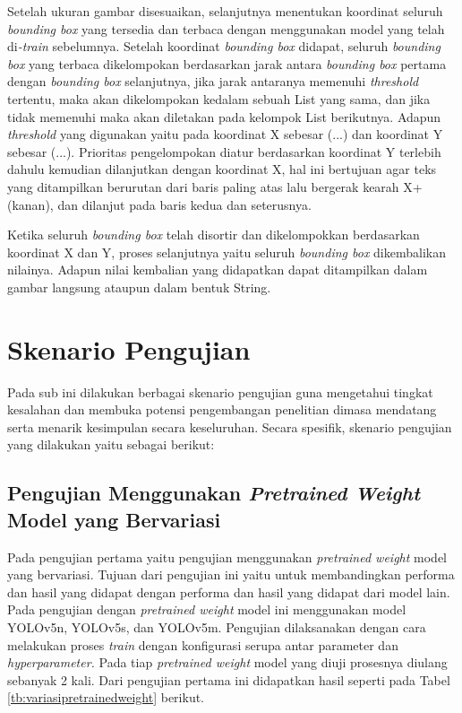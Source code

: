 Setelah ukuran gambar disesuaikan, selanjutnya menentukan koordinat seluruh \textit{bounding box} yang tersedia dan terbaca dengan menggunakan model yang telah di\textit{-train} sebelumnya. Setelah koordinat \textit{bounding box} didapat, seluruh \textit{bounding box} yang terbaca dikelompokan berdasarkan jarak antara \textit{bounding box} pertama dengan \textit{bounding box} selanjutnya, jika jarak antaranya memenuhi \textit{threshold} tertentu, maka akan dikelompokan kedalam sebuah List yang sama, dan jika tidak memenuhi maka akan diletakan pada kelompok List berikutnya. Adapun \textit{threshold} yang digunakan yaitu pada koordinat X sebesar (...) dan koordinat Y sebesar (...). Prioritas pengelompokan diatur berdasarkan koordinat Y terlebih dahulu kemudian dilanjutkan dengan koordinat X, hal ini bertujuan agar teks yang ditampilkan berurutan dari baris paling atas lalu bergerak kearah X+ (kanan), dan dilanjut pada baris kedua dan seterusnya. \par

Ketika seluruh \textit{bounding box} telah disortir dan dikelompokkan berdasarkan koordinat X dan Y, proses selanjutnya yaitu seluruh \textit{bounding box} dikembalikan nilainya. Adapun nilai kembalian yang didapatkan dapat ditampilkan dalam gambar langsung ataupun dalam bentuk String. 

\section{Skenario Pengujian}
\label{sec:skenariopengujian}

Pada sub ini dilakukan berbagai skenario pengujian guna mengetahui tingkat kesalahan dan membuka potensi pengembangan penelitian dimasa mendatang serta menarik kesimpulan secara keseluruhan. Secara spesifik, skenario pengujian yang dilakukan yaitu sebagai berikut: \par

\subsection{Pengujian Menggunakan \textit{Pretrained Weight} Model yang Bervariasi}
\label{subsec:pengujianpretrainedweight}

Pada pengujian pertama yaitu pengujian menggunakan \textit{pretrained weight} model yang bervariasi. Tujuan dari pengujian ini yaitu untuk membandingkan performa dan hasil yang didapat dengan performa dan hasil yang didapat dari model lain. Pada pengujian dengan \textit{pretrained weight} model ini menggunakan model YOLOv5n, YOLOv5s, dan YOLOv5m. Pengujian dilaksanakan dengan cara melakukan proses \textit{train} dengan konfigurasi serupa antar parameter dan \textit{hyperparameter.} Pada tiap \textit{pretrained weight} model yang diuji prosesnya diulang sebanyak 2 kali. Dari pengujian pertama ini didapatkan hasil seperti pada Tabel \ref*{tb:variasipretrainedweight} berikut. \par

